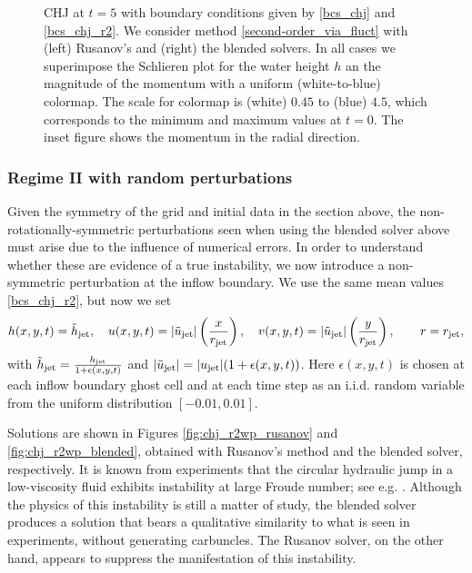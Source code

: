 \documentclass[preprint, 11pt]{article}
\newcommand{\jet}{{\textup{jet}}}
\newcommand{\bfu}{{u}}
\begin{document}
\begin{figure}[!h]
  \caption{CHJ at $t=5$ with boundary conditions given by \eqref{bcs_chj} and \eqref{bcs_chj_r2}. 
    We consider method \eqref{second-order_via_fluct} with (left) Rusanov's
    and (right) the blended solvers. 
    In all cases we superimpose the Schlieren plot for the water height $h$
    an the magnitude of the momentum with a uniform (white-to-blue) colormap. 
    The scale for colormap is (white) $0.45$ to (blue) $4.5$, 
    which corresponds to the minimum and maximum values at $t=0$.
    The inset figure shows the momentum in the radial direction.
    \label{fig:chj_r2_later}}
\end{figure}

\subsubsection{Regime II with random perturbations}\label{sec:regime_iiwp}
Given the symmetry of the grid and initial data in the section above,
the non-rotationally-symmetric perturbations seen when using the blended
solver above must arise due to the influence of numerical errors.
In order to understand whether these are evidence of a true instability,
we now introduce a non-symmetric perturbation at the inflow boundary.
We use the same mean values \eqref{bcs_chj_r2}, but now we set
\begin{subequations}
  \begin{align}
    h(x,y,t)=\tilde h_\jet, \quad
    u(x,y,t)=|\tilde \bfu_\jet| \left(\frac{x}{r_\jet}\right), \quad
    v(x,y,t)=|\tilde \bfu_\jet| \left(\frac{y}{r_\jet}\right), \qquad r=r_\jet,
  \end{align}
\end{subequations}
with $\tilde h_\jet = \frac{h_\jet}{1+\epsilon(x,y,t)}$ and $|\tilde\bfu_\jet|=|\bfu_\jet|(1+\epsilon(x,y,t))$.
Here $\epsilon(x,y,t)$ is chosen at each inflow boundary ghost cell and at each
time step as an i.i.d. random variable from the uniform distribution $[-0.01,0.01]$.

{\color{OliveGreen} 
Solutions are shown in Figures \ref{fig:chj_r2wp_rusanov} and \ref{fig:chj_r2wp_blended},
obtained with Rusanov's method and the blended solver, respectively.
It is known from experiments that the circular hydraulic jump in a low-viscosity fluid
exhibits instability at large Froude number; see e.g. \cite[Figure~2]{craik1981circular}.
Although the physics of this instability is still a matter of study, the blended solver
produces a solution that bears a qualitative similarity to what is seen in experiments,
without generating carbuncles.  The Rusanov solver, on the other hand, appears to suppress
the manifestation of this instability.
}
\end{document}
